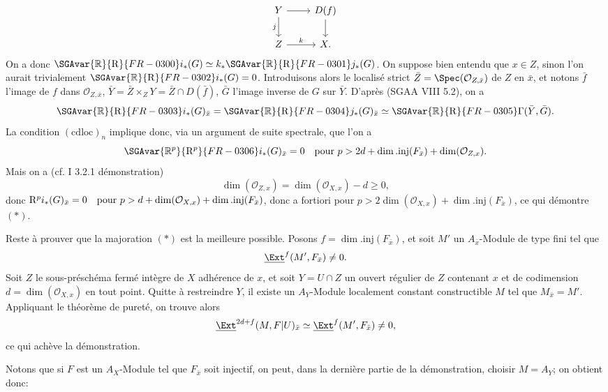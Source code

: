 \[
\begin{tikzcd}
Y \arrow[r] \arrow[d,"j"'] & D(f) \arrow[d]\\
Z \arrow[r,"k"] & X.
\end{tikzcd}
\]
On a
donc $\SGAvar{\mathbb{R}}{\mathrm{R}}{FR-0300} i_*(G)\simeq k_*\SGAvar{\mathbb{R}}{\mathrm{R}}{FR-0301} j_*(G)$. On suppose bien entendu que $x\in Z$, sinon l'on aurait trivialement $\SGAvar{\mathbb{R}}{\mathrm{R}}{FR-0302} i_*(G)=0$. Introduisons alors le localisé strict $\bar{Z}=\Spec(\mathcal{O}_{Z,\bar{x}})$ de $Z$ en $\bar{x}$, et notons $\bar{f}$ l'image de $f$ dans $\mathcal{O}_{Z,\bar{x}}$, $\bar{Y}=\bar{Z}\times_ZY=\bar{Z}\cap D(\bar{f})$, $\bar{G}$ l'image inverse de $G$ sur $\bar{Y}$. D'après (SGAA VIII 5.2), on a
\[
        \SGAvar{\mathbb{R}}{\mathrm{R}}{FR-0303} i_*(G)_{\bar{x}}=\SGAvar{\mathbb{R}}{\mathrm{R}}{FR-0304} j_*(G)_{\bar{x}}\simeq \SGAvar{\mathbb{R}}{\mathrm{R}}{FR-0305}\Gamma(\bar{Y},\bar{G}).
\]
La condition $(\mathrm{cdloc})_n$ implique donc, via un argument de suite spectrale, que l'on a
\[
        \SGAvar{\mathbb{R}^p}{\mathrm{R}^p}{FR-0306} i_*(G)_{\bar{x}}=0\quad\hbox{pour }p>2d+\dim.\mathrm{inj}(F_{\bar{x}})+\dim(\mathcal{O}_{Z,x}).
\]
Mais on a (cf. I 3.2.1 démonstration)
\[
        \dim(\mathcal{O}_{Z,x})=\dim(\mathcal{O}_{X,x})-d\geq0,
\]
donc $\mathrm{R}^p i_*(G)_{\bar{x}}=0\quad\hbox{pour }p>d+\dim(\mathcal{O}_{X,x})+\dim.\mathrm{inj}(F_{\bar{x}})$,
donc a fortiori pour $p>2\dim(\mathcal{O}_{X,x})+\dim.\mathrm{inj}(F_{\bar{x}})$, ce qui démontre $(*)$.

Reste à prouver que la majoration $(*)$ est la meilleure possible. Posons $f=\dim.\mathrm{inj}(F_{\bar{x}})$, et soit $M'$ un $A_{\bar{x}}$-Module de type fini tel que
\[
        \underline{\Ext}^f(M',F_{\bar{x}})\neq0.
\]
Soit $Z$ le sous-préschéma fermé intègre de $X$ adhérence de $x$, et soit $Y=U\cap Z$ un ouvert régulier de $Z$ contenant $x$ et de codimension $d=\dim(\mathcal{O}_{X,x})$ en tout point. Quitte à restreindre $Y$, il existe un $A_Y$-Module localement constant constructible $M$ tel que $M_{\bar{x}}=M'$. Appliquant le théorème de pureté, on trouve alors
\[
        \underline{\Ext}^{2d+f}(M,F|U)_{\bar{x}}\simeq \underline{\Ext}^f(M',F_{\bar{x}})\neq0,
\]
ce qui achève la démonstration.

Notons que si $F$ est un $A_X$-Module tel que $F_{\bar{x}}$ soit injectif, on peut, dans la dernière partie de la démonstration, choisir $M=A_Y$; on obtient donc:

